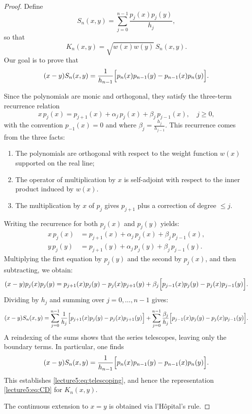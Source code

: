 \documentclass[letterpaper,11pt,oneside,reqno]{book}
\numberwithin{equation}{chapter}  %
\theoremstyle{definition}
\begin{document}
\begin{proof}
Define
\[
S_n(x,y)=\sum_{j=0}^{n-1}\frac{p_j(x)p_j(y)}{h_j},
\]
so that
\[
K_n(x,y)=\sqrt{w(x)w(y)}\,S_n(x,y).
\]
Our goal is to prove that
\begin{equation}
\label{lecture5:eq:telescoping}
(x-y)S_n(x,y)=\frac{1}{h_{n-1}}\Bigl[p_n(x)p_{n-1}(y)-p_{n-1}(x)p_n(y)\Bigr].
\end{equation}

Since the polynomials are monic and orthogonal, they satisfy the three-term recurrence relation
\[
x\,p_j(x)=p_{j+1}(x)+\alpha_j\,p_j(x)+\beta_j\,p_{j-1}(x),\quad j\ge0,
\]
with the convention \(p_{-1}(x)=0\) and where \(\beta_j = \frac{h_j}{h_{j-1}}\).
This recurrence comes from the three facts:
\begin{enumerate}
	\item The polynomials are orthogonal with respect to the weight function \(w(x)\) supported on the real line;
	\item The operator of multiplication by \(x\) is self-adjoint with respect to the inner product induced by \(w(x)\).
	\item The multiplication by $x$ of $p_j$ gives $p_{j+1}$ plus a correction of degree $\le j$.
\end{enumerate}


Writing the recurrence for both \(p_j(x)\) and \(p_j(y)\) yields:
\[
\begin{aligned}
x\,p_j(x)&=p_{j+1}(x)+\alpha_j\,p_j(x)+\beta_j\,p_{j-1}(x),\\[1mm]
y\,p_j(y)&=p_{j+1}(y)+\alpha_j\,p_j(y)+\beta_j\,p_{j-1}(y).
\end{aligned}
\]
Multiplying the first equation by \(p_j(y)\) and the second by \(p_j(x)\), and then subtracting, we obtain:
\[
(x-y)p_j(x)p_j(y)=p_{j+1}(x)p_j(y)-p_j(x)p_{j+1}(y)
+\beta_j\Bigl[p_{j-1}(x)p_j(y)-p_j(x)p_{j-1}(y)\Bigr].
\]
Dividing by \(h_j\) and summing over \(j=0,\ldots,n-1\) gives:
\[
(x-y)S_n(x,y)
=\sum_{j=0}^{n-1}\frac{1}{h_j}\Bigl[p_{j+1}(x)p_j(y)-p_j(x)p_{j+1}(y)\Bigr]
+\sum_{j=0}^{n-1}\frac{\beta_j}{h_j}\Bigl[p_{j-1}(x)p_j(y)-p_j(x)p_{j-1}(y)\Bigr].
\]
A reindexing of the sums shows that the series telescopes, leaving only the boundary terms. In particular, one finds
\[
(x-y)S_n(x,y)=\frac{1}{h_{n-1}}\Bigl[p_n(x)p_{n-1}(y)-p_{n-1}(x)p_n(y)\Bigr].
\]
This establishes \eqref{lecture5:eq:telescoping}, and hence the representation \eqref{lecture5:eq:CD} for \(K_n(x,y)\).

The continuous extension to \(x=y\) is obtained via l’Hôpital’s rule.
\end{proof}
\end{document}
